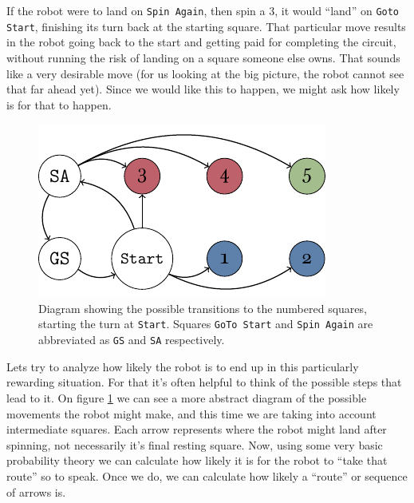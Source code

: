 If the robot were to land on \texttt{Spin Again}, then spin a 
3, it would ``land'' on \texttt{Goto Start}, finishing its turn 
back at the starting square. That particular move results in 
the robot going back to the start and getting paid for 
completing the circuit, without running the risk of landing on 
a square someone else owns. That sounds like a very desirable 
move (for us looking at the big picture, the robot cannot see 
that far ahead yet). Since we would like this to happen, we 
might ask how likely is for that to happen.

\begin{figure}[h]
	\centering
	\includegraphics[width=\textwidth]{img/transicion.pdf}
	\caption{Diagram showing the possible transitions to the 
	numbered squares, starting the turn at \texttt{Start}. 
	Squares \texttt{GoTo Start} and \texttt{Spin Again} are 
	abbreviated as \texttt{GS} and \texttt{SA} respectively.}
	\label{fig:miniopoly-transicion}
\end{figure}

Lets try to analyze how likely the robot is to end up in this 
particularly rewarding situation. For that it's often helpful 
to think of the possible steps that lead to it. On figure 
\ref{fig:miniopoly-transicion} we can see a more abstract 
diagram of the possible movements the robot might make, and 
this time we are taking into account intermediate squares. Each 
arrow represents where the robot might land after spinning, not 
necessarily it's final resting square. Now, using some very 
basic probability theory we can calculate how likely it is for 
the robot to ``take that route'' so to speak. Once we do, we 
can calculate how likely a ``route'' or sequence of arrows is.

